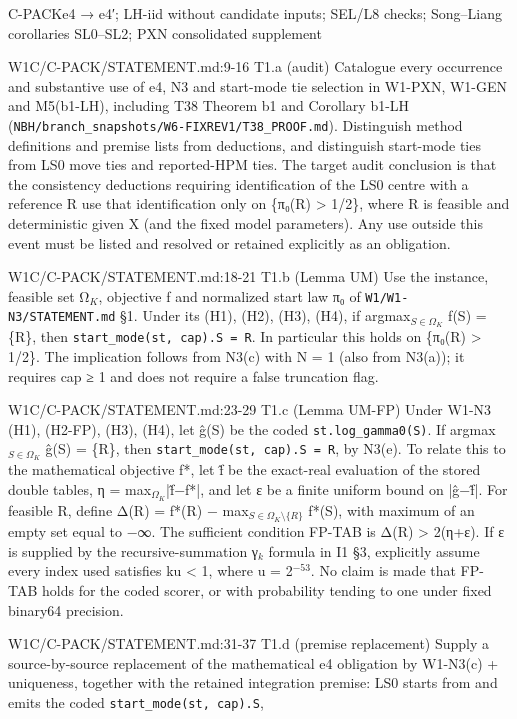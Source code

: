 \begin{card}{C-PACK}{e4 → e4′; LH-iid without candidate inputs; SEL/L8 checks; Song–Liang corollaries SL0–SL2; PXN consolidated supplement}
\begin{stmt}{W1C/C-PACK/STATEMENT.md:9-16}
T1.a (audit) Catalogue every occurrence and substantive use of e4, N3 and start-mode tie selection in W1-PXN, W1-GEN and
M5(b1-LH), including T38 Theorem b1 and Corollary b1-LH (\texttt{NBH/branch\_snapshots/W6-FIXREV1/T38\_PROOF.md}). Distinguish
method definitions and premise lists from deductions, and distinguish start-mode ties from LS0 move ties and
reported-HPM ties. The target audit conclusion is that the consistency deductions requiring identification of the LS0
centre with a reference R use that identification only on \{π₀(R) > 1/2\}, where R is feasible and deterministic given X
(and the fixed model parameters). Any use outside this event must be listed and resolved or retained explicitly as an
obligation.
\end{stmt}
\begin{stmt}{W1C/C-PACK/STATEMENT.md:18-21}
T1.b (Lemma UM) Use the instance, feasible set Ω$_{K}$, objective f and normalized start law π₀ of \texttt{W1/W1-N3/STATEMENT.md}
§1. Under its (H1), (H2), (H3), (H4), if argmax$_{S\in\Omega_{K}}$ f(S) = \{R\}, then \texttt{start\_mode(st, cap).S = R}. In particular this
holds on \{π₀(R) > 1/2\}. The implication follows from N3(c) with N = 1 (also from N3(a)); it requires cap ≥ 1 and does not
require a false truncation flag.
\end{stmt}
\begin{stmt}{W1C/C-PACK/STATEMENT.md:23-29}
T1.c (Lemma UM-FP) Under W1-N3 (H1), (H2-FP), (H3), (H4), let ĝ(S) be the coded \texttt{st.log\_gamma0(S)}. If
argmax$_{S\in\Omega_{K}}$ ĝ(S) = \{R\}, then \texttt{start\_mode(st, cap).S = R}, by N3(e). To relate this to the mathematical objective f*,
let f̂ be the exact-real evaluation of the stored double tables, η = max$_{\Omega_{K}}$|f̂−f*|, and let ε be a finite uniform bound
on |ĝ−f̂|. For feasible R, define Δ(R) = f*(R) − max$_{S\in\Omega_{K}\setminus\{R\}}$ f*(S), with maximum of an empty set equal to −∞. The
sufficient condition FP-TAB is Δ(R) > 2(η+ε). If ε is supplied by the recursive-summation γ$_{k}$ formula in I1 §3,
explicitly assume every index used satisfies ku < 1, where u = 2$^{-53}$. No claim is made that FP-TAB holds for the coded
scorer, or with probability tending to one under fixed binary64 precision.
\end{stmt}
\begin{stmt}{W1C/C-PACK/STATEMENT.md:31-37}
T1.d (premise replacement) Supply a source-by-source replacement of the mathematical e4 obligation by W1-N3(c) +
uniqueness, together with the retained integration premise: LS0 starts from and emits the coded \texttt{start\_mode(st, cap).S},

\end{stmt}
\end{card}
